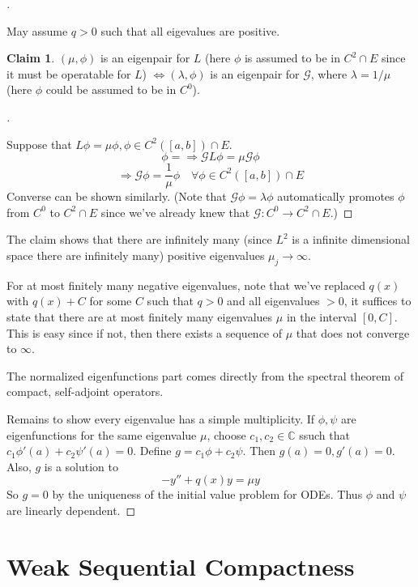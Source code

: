\documentclass{article}
\theoremstyle{definition}
\newtheorem*{clm}{Claim}
\newenvironment{proofs}[1][\proofname]{%
  \begin{proof}[#1]$ $\par\nobreak\ignorespaces
}{%
  \end{proof}
}
\newcommand{\CC}{\mathbb C}
\newcommand{\G}{\mathcal G}
\begin{document}
\begin{proofs}
	May assume $q > 0$ such that all eigevalues are positive.
	\begin{clm}
		$(\mu, \phi)$ is an eigenpair for $L$ (here $\phi$ is assumed to be in $C^2 \cap E$ since it must be operatable for $L$) $\Leftrightarrow (\lambda, \phi)$ is an eigenpair for $\G$, where $\lambda = 1/\mu$ (here $\phi$ could be assumed to be in $C^0$).
	\end{clm}

	\begin{proofs}
		Suppose that $L \phi = \mu \phi, \phi \in C^2([a, b]) \cap E$.
		\[
			\phi = \Rightarrow \G L \phi = \mu \G \phi
		\]
		\[
			\Rightarrow \G \phi = \frac{1}{\mu} \phi \quad \forall \phi \in C^2([a, b]) \cap E
		\]
		Converse can be shown similarly.
		(Note that $\G \phi = \lambda \phi$ automatically promotes $\phi$ from $C^0$ to $C^2 \cap E$ since we've already knew that $\G: C^0 \to C^2 \cap E$.)
	\end{proofs}
	The claim shows that there are infinitely many (since $L^2$ is a infinite dimensional space there are infinitely many) positive eigenvalues $\mu_j \to \infty$.
	\par For at most finitely many negative eigenvalues, note that we've replaced $q(x)$ with $q(x) + C$ for some $C$ such that $q > 0$ and all eigenvalues $> 0$, 
	it suffices to state that there are at most finitely many eigenvalues $\mu$ in the interval $[0, C]$.
	This is easy since if not, then there exists a sequence of $\mu$ that does not converge to $\infty$.
	\par The normalized eigenfunctions part comes directly from the spectral theorem of compact, self-adjoint operators.
	\par Remains to show every eigenvalue has a simple multiplicity.
	If $\phi, \psi$ are eigenfunctions for the same eigenvalue $\mu$, choose $c_1, c_2 \in \CC$ ssuch that $c_1 \phi'(a) + c_2 \psi'(a) = 0$.
	Define $g = c_1 \phi + c_2 \psi$.
	Then $g(a) = 0, g'(a) = 0$.
	Also, $g$ is a solution to 
	\[
		-y'' + q(x) y = \mu y
	\]
	So $g = 0$ by the uniqueness of the initial value problem for ODEs.
	Thus $\phi$ and $\psi$ are linearly dependent.

\end{proofs}

\section{Weak Sequential Compactness}
\end{document}
